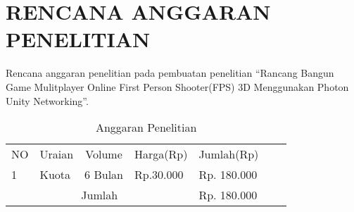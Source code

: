 \chapter*{RENCANA ANGGARAN PENELITIAN}
Rencana anggaran penelitian pada pembuatan penelitian “Rancang Bangun Game Mulitplayer Online First Person Shooter(FPS) 3D Menggunakan Photon Unity Networking”.

\begin{table}[h]
    \centering
    \begin{tabular}{|llcl|l|ll}
    \cline{1-5}
    \multicolumn{1}{|c|}{NO} & \multicolumn{1}{c|}{Uraian}          & \multicolumn{1}{c|}{Volume}  & \multicolumn{1}{c|}{Harga(Rp)} & Jumlah(Rp)    &  &  \\ \cline{1-5}
    \multicolumn{1}{|l|}{1}  & \multicolumn{1}{l|}{Kuota}           & \multicolumn{1}{c|}{6 Bulan} & Rp.30.000                      & Rp. 180.000   &  &  \\ \cline{1-5}

    \multicolumn{4}{|c|}{Jumlah}                                                                                                    & Rp. 180.000 &  &  \\ \cline{1-5}
    \end{tabular}
    \caption{Anggaran Penelitian}
    \label{lab:label-anggaran}
    \end{table}